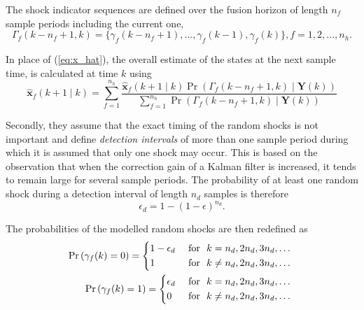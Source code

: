 The shock indicator sequences are defined over the fusion horizon of length $n_f$ sample periods including the current one,
\begin{equation} \label{eq:Gamma_kmf_k}
	\Gamma_f(k-n_f+1,k)=\{\gamma_f(k-n_f+1), ...,  \gamma_f(k-1), \gamma_f(k)\}, f=1,2,...,n_h.
\end{equation}



In place of (\ref{eq:x_hat}), the overall estimate of the states at the next sample time, is calculated at time $k$ using
\begin{equation} \label{eq:x_f_hat_SF}
	\mathbf{\hat{x}}_f(k+1 \mid k) = \sum_{f=1}^{n_h} \frac{\mathbf{\hat{x}}_f(k+1 \mid k) \Pr(\Gamma_f(k-n_f+1,k) \mid \mathbf{Y}(k))}{\sum_{f=1}^{n_h} \Pr(\Gamma_f(k-n_f+1,k) \mid \mathbf{Y}(k))}
\end{equation}

Secondly, they assume that the exact timing of the random shocks is not important and define \textit{detection intervals} of more than one sample period during which it is assumed that only one shock may occur. This is based on the observation that when the correction gain of a Kalman filter is increased, it tends to remain large for several sample periods. The probability of at least one random shock during a detection interval of length $n_d$ samples is therefore
\begin{equation} \label{eq:p_gamma_d}
	\epsilon_d = 1 - (1 - \epsilon)^{n_d}.
\end{equation}

The probabilities of the modelled random shocks are then redefined as
\begin{equation} \label{eq:Pr_gamma_nd}
	\begin{aligned}
		\Pr\left(\gamma_{f}(k)=0\right) = \begin{cases*}
			1 - \epsilon_d & \text { for } $k = n_d, 2n_d, 3n_d, \ldots$ \\
			1 & \text { for } $k \ne n_d, 2n_d, 3n_d, \ldots$
		\end{cases*} \\
		\Pr\left(\gamma_{f}(k)=1\right) = \begin{cases*}
			\epsilon_d & \text { for } $k = n_d, 2n_d, 3n_d, \ldots$ \\
			0 & \text { for } $k \ne n_d, 2n_d, 3n_d, \ldots$
		\end{cases*} \\
	\end{aligned}
\end{equation}

